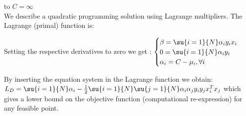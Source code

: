 to $C=\infty$\\
We describe a quadratic programming solution using Lagrange multipliers.
The Lagrange (primal) function is:
\begin{center}
\end{center}
Setting the respective derivatives to zero we get : 
$
\begin{cases}
	\beta = \su{{i=1}}{N}\alpha_{i}y_{i}x_{i}\\
	0 = \su{{i=1}}{N}\alpha_{i}y_{i}\\
	\alpha_{i} = C-\mu_{i}, \forall i
\end{cases}
$

By inserting the equation system in the Lagrange function we obtain:
$L_{D} = \su{{i=1}}{N}\alpha_{i} - \frac{1}{2}\su{{i=1}}{N}\su{{j=1}}{N} \alpha_{i}\alpha_{j}
y_{i}y_{j}x_{i}^{T}x_{j}$ which gives a lower bound on the objective function (computational 
re-expression) for any feasible point.

